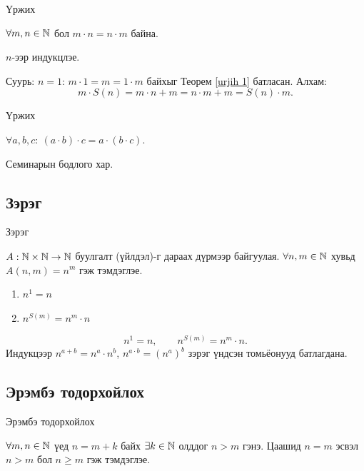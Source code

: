 \begin{frame}[allowframebreaks]{Үржих}
\begin{theorem}
$\forall m,n\in\mathbb{N}$ бол $ m\cdot n=n\cdot m$ байна.
\end{theorem}
\begin{prof}
$n$-ээр индукцлэе. 

Суурь: $n=1$: $m\cdot 1=m=1\cdot m$ байхыг Теорем \ref{urjih 1} батласан. 
Алхам:
\[m\cdot S(n)=m\cdot n+m= n\cdot m+m=S(n)\cdot m.\]
\end{prof}
\end{frame}

\begin{frame}[allowframebreaks]{Үржих}
\begin{theorem}
$\forall a,b,c:\ (a\cdot b)\cdot c=a\cdot(b\cdot c)$.
\end{theorem}
\begin{prof}
     Семинарын бодлого хар.
\end{prof}
\end{frame}

\subsection{Зэрэг}
\begin{frame}[allowframebreaks]{Зэрэг}
 \begin{definition}[Зэрэг] $ A: \mathbb{N}\times \mathbb{N}\to\mathbb{N}$ буулгалт (үйлдэл)-г дараах дүрмээр байгуулая. $\forall n , m\in\mathbb{N}$ хувьд $A(n,m)=n^ m$ гэж тэмдэглэе.
\begin{enumerate}[label=\textbf{Z\arabic*})]
    \item $ n^1= n$
    \item $n^{S(m)}=n^ m\cdot n$
\end{enumerate} 
\end{definition}
\[n^{1}=n,\qquad n^{S(m)}=n^{m}\cdot n.\]
Индукцээр $n^{a+b}=n^a\cdot n^b$, $n^{a\cdot b}=(n^a)^b$ зэрэг үндсэн томьёонууд батлагдана.
\end{frame}

\subsection{Эрэмбэ тодорхойлох}
\begin{frame}[allowframebreaks]{Эрэмбэ тодорхойлох}
\begin{definition}
$\forall m,n\in\mathbb{N}$ үед $n=m+k$ байх $\exists k\in\mathbb{N}$ олддог $n>m$ гэнэ. Цаашид $n=m$ эсвэл $n>m$ бол $n\ge m$ гэж тэмдэглэе.
\end{definition}
\end{frame}

